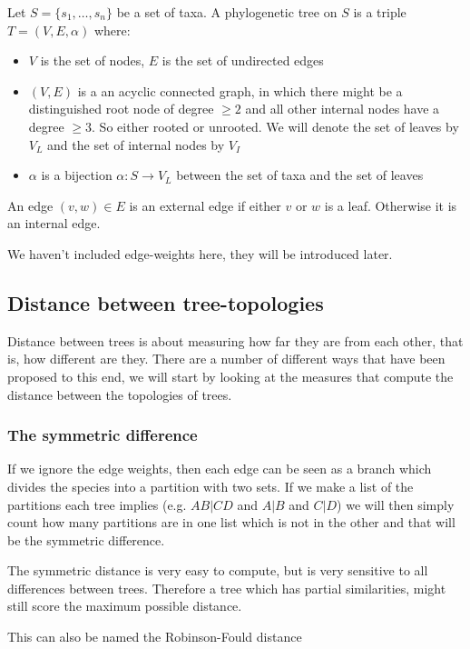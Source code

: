     Let $S=\{s_1,\dots,s_n\}$ be a set of taxa. A phylogenetic tree on $S$ is a 
    triple $T=(V,E,\alpha)$ where:
    \begin{itemize}
        \item $V$ is the set of nodes, $E$ is the set of undirected edges
        \item $(V,E)$ is a an acyclic connected graph, in which there might be 
        a distinguished root node of degree $\geq 2$ and all other internal 
        nodes have a degree $\geq 3$. So either rooted or unrooted. We will 
        denote the set of leaves by $V_L$ and the set of internal nodes by $V_I$
        \item $\alpha$ is a bijection $\alpha: S \rightarrow V_L$ between the 
        set of taxa and the set of leaves
    \end{itemize}
    An edge $(v,w) \in E$ is an external edge if either $v$ or $w$ is a leaf. 
    Otherwise it is an internal edge.
    
    We haven't included edge-weights here, they will be introduced later.
    
    \subsection{Distance between tree-topologies}
    Distance between trees is about measuring how far they are from each other, 
    that is, how different are they. There are a number of different ways that 
    have been proposed to this end, we will start by looking at the measures 
    that compute the distance between the topologies of trees.
    
    \subsubsection{The symmetric difference}
    If we ignore the edge weights, then each edge can be seen as a branch which 
    divides the species into a partition with two sets. If we make a list of 
    the partitions each tree implies (e.g. $AB|CD$ and $A|B$ and $C|D$)  we 
    will then simply count how many partitions are in one list which is not in 
    the other and that will be the symmetric difference.
    
    The symmetric distance is very easy to compute, but is very sensitive to 
    all differences between trees. Therefore a tree which has partial 
    similarities, might still score the maximum possible distance.
    
    This can also be named the Robinson-Fould distance
    
